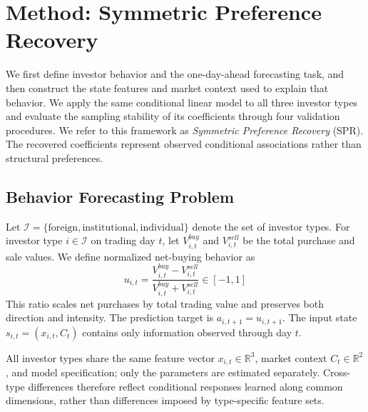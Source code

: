 
\section{Method: Symmetric Preference Recovery}
\label{sec:method}

We first define investor behavior and the one-day-ahead forecasting task, and then construct
the state features and market context used to explain that behavior. We apply the same
conditional linear model to all three investor types and evaluate the sampling stability of
its coefficients through four validation procedures. We refer to this framework as
\emph{Symmetric Preference Recovery} (SPR). The recovered coefficients represent observed
conditional associations rather than structural preferences.

\subsection{Behavior Forecasting Problem}
\label{sec:setup}

Let $\mathcal I=\{\mathrm{foreign},\mathrm{institutional},\mathrm{individual}\}$ denote
the set of investor types. For investor type $i\in\mathcal I$ on trading day $t$, let
$V^{buy}_{i,t}$ and $V^{sell}_{i,t}$ be the total purchase and sale values. We define
normalized net-buying behavior as
\begin{equation}
u_{i,t}=\frac{V^{buy}_{i,t}-V^{sell}_{i,t}}{V^{buy}_{i,t}+V^{sell}_{i,t}}\in[-1,1]
\label{eq:action}
\end{equation}
This ratio scales net purchases by total trading value and preserves both direction and
intensity. The prediction target is $a_{i,t+1}=u_{i,t+1}$. The input state
$s_{i,t}=(x_{i,t},C_t)$ contains only information observed through day $t$.

All investor types share the same feature vector $x_{i,t}\in\mathbb R^3$, market context
$C_t\in\mathbb R^2$, and model specification; only the parameters are estimated separately.
Cross-type differences therefore reflect conditional responses learned along common
dimensions, rather than differences imposed by type-specific feature sets.

